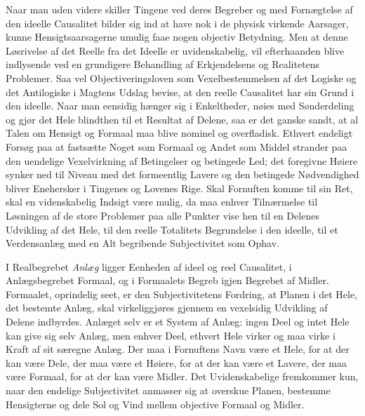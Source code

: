 \documentclass[12pt]{article}
\newcommand{\opage}[1]{\marginnote{\footnotesize\textit{[#1]}}}
\begin{document}
Naar man uden videre skiller Tingene ved deres Begreber og med
Fornægtelse af den ideelle Causalitet bilder sig ind at
\opage{49} have nok i de physisk virkende Aarsager, kunne Hensigtsaarsagerne
umulig faae nogen objectiv Betydning. Men at denne Løsrivelse af det
Reelle fra det Ideelle er uvidenskabelig, vil efterhaanden blive
indlysende ved en grundigere Behandling af Erkjendelsens og
Realitetens Problemer. Saa vel Objectiveringsloven som
Vexelbestemmelsen af det Logiske og det Antilogiske i Magtens Udslag
bevise, at den reelle Causalitet har sin Grund i den ideelle. Naar
man eensidig hænger sig i Enkeltheder, nøies med Sønderdeling og
gjør det Hele blindthen til et Resultat af Delene, saa er det ganske
sandt, at al Talen om Hensigt og Formaal maa blive nominel og
overfladisk. Ethvert endeligt Forsøg paa at fastsætte Noget som
Formaal og Andet som Middel strander paa den uendelige Vexelvirkning
af Betingelser og betingede Led; det foregivne Høiere synker ned til
Niveau med det formeentlig Lavere og den betingede Nødvendighed
bliver Enehersker i Tingenes og Lovenes Rige. Skal Fornuften komme
til sin Ret, skal en videnskabelig Indsigt være mulig, da maa enhver
Tilnærmelse til Løsningen af de store Problemer paa alle Punkter vise
hen til en Delenes Udvikling af det Hele, til den reelle Totalitets
Begrundelse i den ideelle, til et Verdensanlæg med en Alt begribende
Subjectivitet som Ophav.

I Realbegrebet \emph{Anlæg} ligger Eenheden af ideel og reel
Causalitet, i Anlægsbegrebet Formaal, og i Formaalets Begreb igjen
Begrebet af Midler. Formaalet, oprindelig seet, er den
Subjectivitetens Fordring, at Planen i det Hele, det bestemte Anlæg,
skal virkeliggjøres gjennem en vexelsidig Udvikling af Delene
indbyrdes. Anlæget selv er et System af Anlæg: ingen Deel og intet
Hele kan give sig selv Anlæg, men enhver Deel, ethvert Hele virker
og maa virke i Kraft af sit særegne Anlæg. Der maa i Fornuftens Navn
være et Hele, for at der kan være Dele, der maa være et Høiere, for
at der kan være et Lavere, der maa være Formaal, for at der kan være
Midler. Det Uvidenskabelige fremkommer kun, naar den endelige
Subjectivitet anmasser sig at overskue Planen, bestemme Hensigterne
og dele Sol og Vind mellem objective Formaal og Midler.
\end{document}
